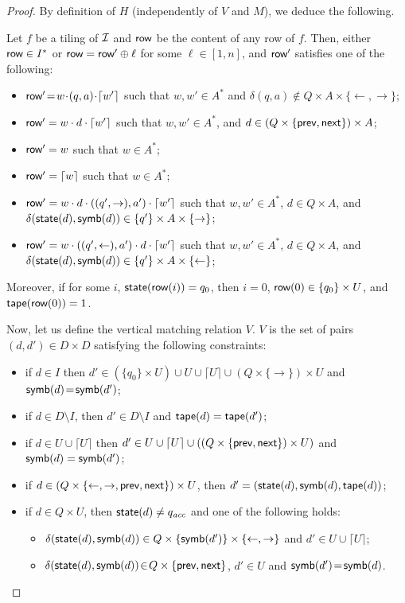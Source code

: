 \begin{proof}
By definition of $H$ (independently of $V$ and $M$), we deduce the following.
\begin{claim}\label{cl:ccl1}
Let $f$ be a tiling of $\mathcal{I}$ and $\text{{\sffamily row}}$ be the content of any row of $f$. Then, either $\text{{\sffamily row}} \in I^{*}$ 
or $\text{{\sffamily row}} =\text{{\sffamily row}}' \oplus \ell$ for some $\ell\in [1,n]$, and $\text{{\sffamily row}}'$ satisfies one of the following:
\begin{itemize}
  \item $\text{{\sffamily row}}' \!=\! w \!\cdot\! (q,a)\!\cdot\! \lceil w' \rceil$ such that $w,\! w'\!\in\! A^{*}$ and $\delta(q,a)\!\notin\! Q\!\times\! A \!\times\! \{\leftarrow,\rightarrow\} $;
  \item $\text{{\sffamily row}}' = w \cdot d \cdot \lceil w' \rceil $ such that $w,w'\in A^{*}$, and $d\in  (Q \times \{\text{{\sffamily prev}},\text{{\sffamily next}}\})\times A$;
  \item $\text{{\sffamily row}}' = w$ such that $w\in A^{*}$;
  \item $\text{{\sffamily row}}'= \lceil w \rceil$ such that $w\in A^{*}$;
  \item $\text{{\sffamily row}}' = w \cdot d \cdot ((q', \rightarrow),a')\cdot \lceil w'\rceil $ such that $w,w'\in A^{*}$, $d\in Q\times A$, and $\delta(\text{{\sffamily state}}(d),\text{{\sffamily symb}}(d))\in \{q'\}\times A \times \{\rightarrow\} $;
  \item $\text{{\sffamily row}}' =  w  \cdot ((q', \leftarrow), a' ) \cdot d\cdot  \lceil w'\rceil $ such that $w,w'\in A^{*}$, $d\in Q\times A$,  and $\delta(\text{{\sffamily state}}(d),\text{{\sffamily symb}}(d))\in \{q'\}\times A \times \{\leftarrow\} $;
\end{itemize}
Moreover, if for some $i$, $\text{{\sffamily state}}(\text{{\sffamily row}}(i))=q_0$, then $i= 0$, $\text{{\sffamily row}}(0)\in \{q_0\}\times U$, and $\text{{\sffamily tape}}(\text{{\sffamily row}}(0))=1$.
\end{claim}

Now, let us define the vertical matching relation $V$. $V$ is the set of pairs $(d,d')\in D\times D$ satisfying the following constraints:
\begin{itemize}
\item if $d\!\in\! I$ then   $d'\!\in\! (\{q_0\}\times U) \cup U \cup \lceil U \rceil \cup (Q\times \{\rightarrow\})\times U$ and $\text{{\sffamily symb}}(d)\!=\!\text{{\sffamily symb}}(d')$;
\item if $d\in D\setminus I$, then $d'\in D\setminus I$ and $\text{{\sffamily tape}}(d)=\text{{\sffamily tape}}(d')$;
\item if $d \in U \cup \lceil U \rceil$ then $d'\in U \cup \lceil U \rceil \cup ((Q\times \{\text{{\sffamily prev}},\text{{\sffamily next}}\})\times U)$ and $\text{{\sffamily symb}}(d)=\text{{\sffamily symb}}(d')$;
\item if $d\in (Q \times \{\leftarrow,\rightarrow,\text{{\sffamily prev}},\text{{\sffamily next}}\})\times U$, then $d'=(\text{{\sffamily state}}(d),\text{{\sffamily symb}}(d),\text{{\sffamily tape}}(d))$;
\item if $d\in Q\times U$, then $\text{{\sffamily state}}(d)\neq q_{\textit{acc}}$ and one of the following holds:
\begin{itemize}
\item  $\delta(\text{{\sffamily state}}(d),\text{{\sffamily symb}}(d))\in Q\times \{\text{{\sffamily symb}}(d')\}\times \{\leftarrow,\rightarrow\}$ and  $d'\in U\cup \lceil U\rceil$;
\item $\delta(\text{{\sffamily state}}(d),\text{{\sffamily symb}}(d))\!\in\! Q\times \{\text{{\sffamily prev}},\text{{\sffamily next}}\}$, $d'\!\in\! U$ and $\text{{\sffamily symb}}(d')\!=\!\text{{\sffamily symb}}(d)$.
\end{itemize}
\end{itemize}




\end{proof}
